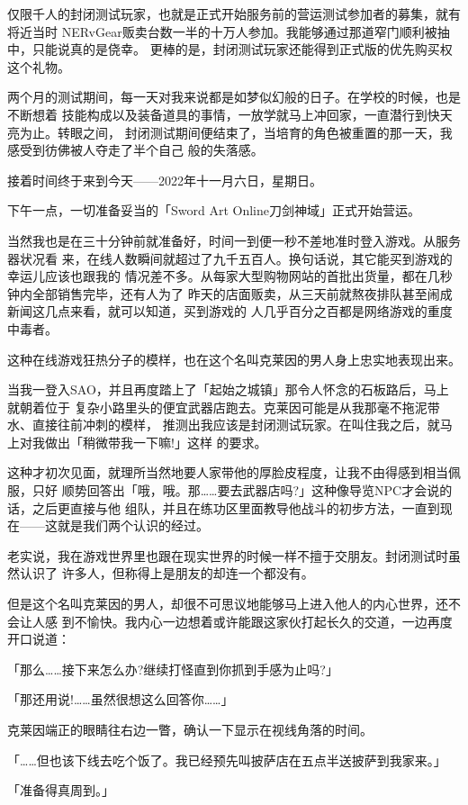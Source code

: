 \documentclass[11pt]{book}
\begin{document}
仅限千人的封闭测试玩家，也就是正式开始服务前的营运测试参加者的募集，就有将近当时
NERvGear贩卖台数一半的十万人参加。我能够通过那道窄门顺利被抽中，只能说真的是侥幸。
更棒的是，封闭测试玩家还能得到正式版的优先购买权这个礼物。

两个月的测试期间，每一天对我来说都是如梦似幻般的日子。在学校的时候，也是不断想着
技能构成以及装备道具的事情，一放学就马上冲回家，一直潜行到快天亮为止。转眼之间，
封闭测试期间便结束了，当培育的角色被重置的那一天，我感受到彷佛被人夺走了半个自己
般的失落感。

接着时间终于来到今天——2022年十一月六日，星期日。

下午一点，一切准备妥当的「Sword Art Online刀剑神域」正式开始营运。

当然我也是在三十分钟前就准备好，时间一到便一秒不差地准时登入游戏。从服务器状况看
来，在线人数瞬间就超过了九千五百人。换句话说，其它能买到游戏的幸运儿应该也跟我的
情况差不多。从每家大型购物网站的首批出货量，都在几秒钟内全部销售完毕，还有人为了
昨天的店面贩卖，从三天前就熬夜排队甚至闹成新闻这几点来看，就可以知道，买到游戏的
人几乎百分之百都是网络游戏的重度中毒者。

这种在线游戏狂热分子的模样，也在这个名叫克莱因的男人身上忠实地表现出来。

当我一登入SAO，并且再度踏上了「起始之城镇」那令人怀念的石板路后，马上就朝着位于
复杂小路里头的便宜武器店跑去。克莱因可能是从我那毫不拖泥带水、直接往前冲刺的模样，
推测出我应该是封闭测试玩家。在叫住我之后，就马上对我做出「稍微带我一下嘛!」这样
的要求。

这种才初次见面，就理所当然地要人家带他的厚脸皮程度，让我不由得感到相当佩服，只好
顺势回答出「哦，哦。那……要去武器店吗?」这种像导览NPC才会说的话，之后更直接与他
组队，并且在练功区里面教导他战斗的初步方法，一直到现在——这就是我们两个认识的经过。

老实说，我在游戏世界里也跟在现实世界的时候一样不擅于交朋友。封闭测试时虽然认识了
许多人，但称得上是朋友的却连一个都没有。

但是这个名叫克莱因的男人，却很不可思议地能够马上进入他人的内心世界，还不会让人感
到不愉快。我内心一边想着或许能跟这家伙打起长久的交道，一边再度开口说道：

「那么……接下来怎么办?继续打怪直到你抓到手感为止吗?」

「那还用说!……虽然很想这么回答你……」

克莱因端正的眼睛往右边一瞥，确认一下显示在视线角落的时间。

「……但也该下线去吃个饭了。我已经预先叫披萨店在五点半送披萨到我家来。」

「准备得真周到。」
\end{document}
